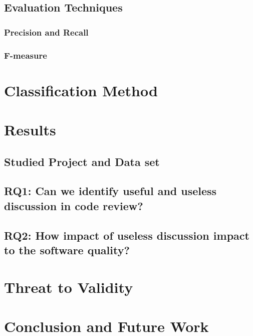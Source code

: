 \documentclass[conference]{IEEEtran}
\begin{document}
\subsection{Evaluation Techniques}
\subsubsection{Precision and Recall}
\subsubsection{F-measure}
\section{Classification Method}
\section{Results}
\subsection{Studied Project and Data set}
\subsection{RQ1: Can we identify useful and useless discussion in code review?}
\subsection{RQ2: How impact of useless discussion impact to the software quality?}
\section{Threat to Validity}
\section{Conclusion and Future Work}


\IEEEpeerreviewmaketitle



%



\end{document}
